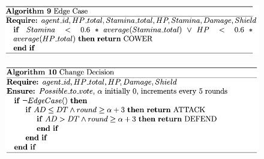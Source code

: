 

\begin{figure}[htb]
    \centering
    \includegraphics[scale=0.7]{006_team_3_agent_design/FIGS/Algo9.png}
    \label{fig:algo9}
\end{figure}




\begin{figure}[htb]
    \centering
    \includegraphics[scale=0.7]{006_team_3_agent_design/FIGS/Algo10.png}
    \label{fig:algo10}
\end{figure}

